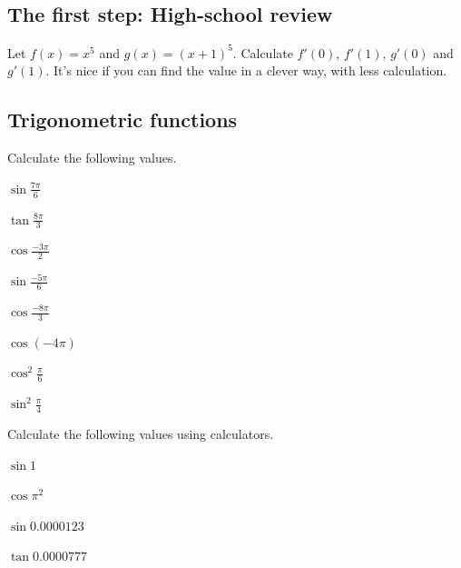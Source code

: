 \documentclass[11pt,pdfa,lastpage]{MishoNote}
\begin{document}
\subsection{The first step: High-school review}
\begin{enumerate}[start=14]
  \itemC Let $f(x)=x^5$ and $g(x)=(x+1)^5$. Calculate $f'(0)$, $f'(1)$, $g'(0)$ and $g'(1)$. It's nice if you can find the value in a clever way, with less calculation.
\end{enumerate}

\subsection{Trigonometric functions}

\begin{enumerate}[resume]
  \itemA Calculate the following values.
  \begin{menumerate}{4}
    \item $\displaystyle\sin\frac{7\pi}6$
    \item $\displaystyle\tan\frac{8\pi}3$
    \item $\displaystyle\cos\frac{-3\pi}2$
    \item $\displaystyle\sin\frac{-5\pi}6$
    \item $\displaystyle\cos\frac{-8\pi}3$
    \item $\cos(-4\pi)$
    \item $\displaystyle\cos^2\frac\pi6$
    \item $\displaystyle\sin^2\frac\pi4$
  \end{menumerate}
  \itemA Calculate the following values using calculators.
  \begin{menumerate}{4}
    \item $\sin1$
    \item $\cos\pi^2$
    \item $\sin0.0000123$
    \item $\tan0.0000777$
   \end{menumerate}
\end{enumerate}
\end{document}
